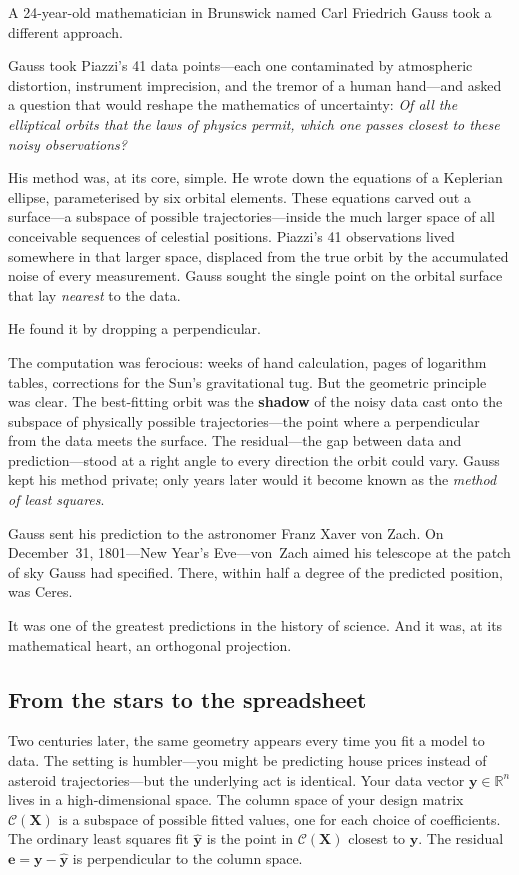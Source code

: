 \documentclass[11pt,a4paper]{article}
\theoremstyle{plain}
\theoremstyle{definition}
\newcommand{\R}{\mathbb{R}}
\newcommand{\yhat}{\hat{\bm{y}}}
\newcommand{\bX}{\bm{X}}
\newcommand{\by}{\bm{y}}
\newcommand{\be}{\bm{e}}
\newcommand{\Col}{\mathcal{C}}
\begin{document}
A 24-year-old mathematician in Brunswick named Carl Friedrich Gauss
took a different approach.

Gauss took Piazzi's 41 data points---each one contaminated by
atmospheric distortion, instrument imprecision, and the tremor of a
human hand---and asked a question that would reshape the mathematics of
uncertainty: \emph{Of all the elliptical orbits that the laws of physics
permit, which one passes closest to these noisy observations?}

His method was, at its core, simple.  He wrote down the
equations of a Keplerian ellipse, parameterised by six orbital elements.
These equations carved out a surface---a subspace of possible
trajectories---inside the much larger space of all conceivable sequences
of celestial positions.  Piazzi's 41 observations lived somewhere in that
larger space, displaced from the true orbit by the accumulated noise of
every measurement.  Gauss sought the single point on the orbital surface
that lay \emph{nearest} to the data.

He found it by dropping a perpendicular.

The computation was ferocious: weeks of hand calculation, pages of
logarithm tables, corrections for the Sun's gravitational tug.  But the
geometric principle was clear.  The best-fitting orbit was the
\textbf{shadow} of the noisy data cast onto the subspace of physically
possible trajectories---the point where a perpendicular from the data
meets the surface.  The residual---the gap between data and
prediction---stood at a right angle to every direction the orbit could
vary.  Gauss kept his method private; only years later would it become
known as the \emph{method of least squares}.

Gauss sent his prediction to the astronomer Franz Xaver von Zach.  On
December~31, 1801---New Year's Eve---von~Zach aimed his telescope at the
patch of sky Gauss had specified.  There, within half a degree of the
predicted position, was Ceres.

It was one of the greatest predictions in the history of science.
And it was, at its mathematical heart, an orthogonal projection.

\bigskip

\subsection*{From the stars to the spreadsheet}

Two centuries later, the same geometry appears every time you fit a
model to data.  The setting is humbler---you might be predicting house
prices instead of asteroid trajectories---but the underlying act is
identical.  Your data vector $\by\in\R^n$ lives in a high-dimensional
space.  The column space of your design matrix $\Col(\bX)$ is a subspace
of possible fitted values, one for each choice of coefficients.  The
ordinary least squares fit $\yhat$ is the point in $\Col(\bX)$ closest
to $\by$.  The residual $\be = \by - \yhat$ is perpendicular to the
column space.
\end{document}
